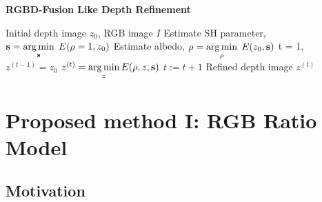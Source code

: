 \begin{algorithm}[!htbp]
	\begin{algorithmic}[1]
  		\caption{\textbf{RGBD-Fusion Like Depth Refinement}}
		\label{alg:rgbd_fusion}
		 \renewcommand{\algorithmicrequire}{\textbf{Input:}}
		 \renewcommand{\algorithmicensure}{\textbf{Output:}}
		 \REQUIRE Initial depth image $z_0$, RGB image $I$
		 \vspace{1.8mm}
		 \STATE Estimate SH parameter, $\mathbf{s} = \operatorname*{arg\,min} \limits_{\mathbf{s}} \; E(\rho = 1, z_0)$ 
		 \STATE Estimate albedo, $\rho = \operatorname*{arg\,min} \limits_{\rho} \; E(z_0, \mathbf{s})$ 
		 \STATE t = 1, $z^{(t-1)} = z_0$
		 \vspace{1.8mm}
		   \vspace{1.8mm}
			  \STATE $z^{(t)} = \operatorname*{arg\,min} \limits_{z} E(\rho, z, \mathbf{s})$ 
		          \STATE $t := t + 1$
		 \vspace{1.8mm}
		  \ENDWHILE
		  \ENSURE  Refined depth image $z^{(t)}$
	\end{algorithmic}
\end{algorithm}


\section{Proposed method I: RGB Ratio Model}

\subsection{Motivation}

